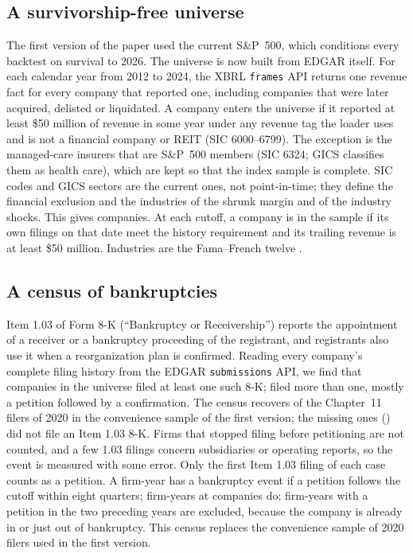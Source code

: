 \subsection{A survivorship-free universe}
The first version of the paper used the current S\&P~500, which conditions every backtest on survival to 2026. The universe is now built from EDGAR itself. For each calendar year from 2012 to 2024, the XBRL \texttt{frames} API returns one revenue fact for every company that reported one, including companies that were later acquired, delisted or liquidated. A company enters the universe if it reported at least \$50 million of revenue in some year under any revenue tag the loader uses and is not a financial company or REIT (SIC 6000--6799). The exception is the managed-care insurers that are S\&P~500 members (SIC 6324; GICS classifies them as health care), which are kept so that the index sample is complete. SIC codes and GICS sectors are the current ones, not point-in-time; they define the financial exclusion and the industries of the shrunk margin and of the industry shocks. This gives \UniverseN{} companies. At each cutoff, a company is in the sample if its own filings on that date meet the history requirement and its trailing revenue is at least \$50 million. Industries are the Fama--French twelve \citep{french_data}.

\subsection{A census of bankruptcies}
Item 1.03 of Form 8-K (``Bankruptcy or Receivership'') reports the appointment of a receiver or a bankruptcy proceeding of the registrant, and registrants also use it when a reorganization plan is confirmed. Reading every company's complete filing history from the EDGAR \texttt{submissions} API, we find that \UniverseBk{} companies in the universe filed at least one such 8-K; \CensusRepeat{} filed more than one, mostly a petition followed by a confirmation. The census recovers \CensusFound{} of the \CensusLegacy{} Chapter~11 filers of 2020 in the convenience sample of the first version; the missing ones (\CensusMissing) did not file an Item 1.03 8-K. Firms that stopped filing before petitioning are not counted, and a few 1.03 filings concern subsidiaries or operating reports, so the event is measured with some error. Only the first Item 1.03 filing of each case counts as a petition. A firm-year has a bankruptcy event if a petition follows the cutoff within eight quarters; \BkPanEv{} firm-years at \BkPanFirms{} companies do; firm-years with a petition in the two preceding years are excluded, because the company is already in or just out of bankruptcy. This census replaces the convenience sample of \CensusLegacy{} 2020 filers used in the first version.

